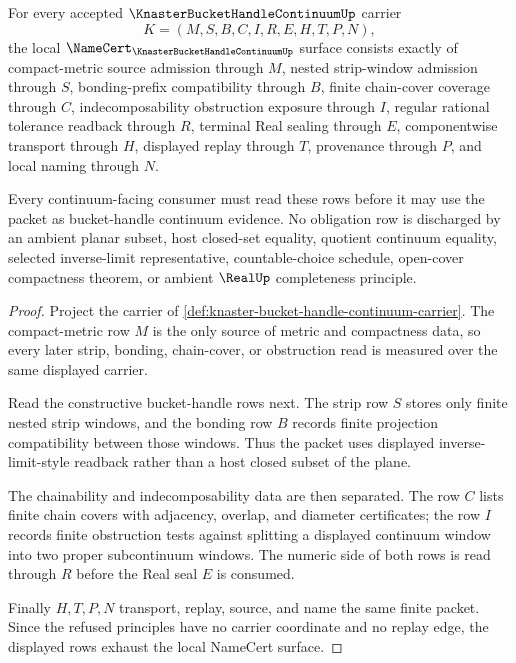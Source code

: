 \begin{theorem}
\label{thm:knaster-bucket-handle-continuum-namecert-obligations}
For every accepted $\KnasterBucketHandleContinuumUp$ carrier
$$
K=(M,S,B,C,I,R,E,H,T,P,N),
$$
the local $\NameCert_{\KnasterBucketHandleContinuumUp}$ surface consists exactly of compact-metric source admission through $M$, nested strip-window admission through $S$, bonding-prefix compatibility through $B$, finite chain-cover coverage through $C$, indecomposability obstruction exposure through $I$, regular rational tolerance readback through $R$, terminal Real sealing through $E$, componentwise transport through $H$, displayed replay through $T$, provenance through $P$, and local naming through $N$.

Every continuum-facing consumer must read these rows before it may use the packet as bucket-handle continuum evidence. No obligation row is discharged by an ambient planar subset, host closed-set equality, quotient continuum equality, selected inverse-limit representative, countable-choice schedule, open-cover compactness theorem, or ambient $\RealUp$ completeness principle.
\end{theorem}
\begin{proof}
Project the carrier of \autoref{def:knaster-bucket-handle-continuum-carrier}. The compact-metric row $M$ is the only source of metric and compactness data, so every later strip, bonding, chain-cover, or obstruction read is measured over the same displayed carrier.

Read the constructive bucket-handle rows next. The strip row $S$ stores only finite nested strip windows, and the bonding row $B$ records finite projection compatibility between those windows. Thus the packet uses displayed inverse-limit-style readback rather than a host closed subset of the plane.

The chainability and indecomposability data are then separated. The row $C$ lists finite chain covers with adjacency, overlap, and diameter certificates; the row $I$ records finite obstruction tests against splitting a displayed continuum window into two proper subcontinuum windows. The numeric side of both rows is read through $R$ before the Real seal $E$ is consumed.

Finally $H,T,P,N$ transport, replay, source, and name the same finite packet. Since the refused principles have no carrier coordinate and no replay edge, the displayed rows exhaust the local NameCert surface.
\end{proof}

